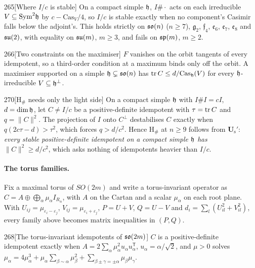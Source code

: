 \begin{Lem}{265}[Where $I/c$ is stable]
On a compact simple $\mathfrak{h}$, $I\#\cdot$ acts on each irreducible $V\subseteq\mathrm{Sym}^2\mathfrak{h}$ by $c-\mathrm{Cas}_V/4$, so $I/c$ is stable exactly when no component's Casimir falls below the adjoint's. This holds strictly on $\mathfrak{so}(n)$ ($n\ge7$), $\mathfrak g_2$, $\mathfrak f_4$, $\mathfrak e_6$, $\mathfrak e_7$, $\mathfrak e_8$ and $\mathfrak{su}(2)$, with equality on $\mathfrak{su}(m)$, $m\ge3$, and fails on $\mathfrak{sp}(m)$, $m\ge2$.
\end{Lem}

\begin{Lem}{266}[Two constraints on the maximiser]
$F$ vanishes on the orbit tangents of every idempotent, so a third-order condition at a maximum binds only off the orbit. A maximiser supported on a simple $\mathfrak{h}\subsetneq\mathfrak{so}(n)$ has $\operatorname{tr} C\le d/\mathrm{Cas}_{\mathfrak{h}}(V)$ for every $\mathfrak{h}$-irreducible $V\subseteq\mathfrak{h}^\perp$.
\end{Lem}

\begin{Lem}{270}[H$_\#$ needs only the light side]
On a compact simple $\mathfrak{h}$ with $I\#I=cI$, $d=\dim\mathfrak{h}$, let $C\ne I/c$ be a positive-definite idempotent with $\tau=\operatorname{tr} C$ and $q=\lVert C\rVert^2$. The projection of $I$ onto $C^\perp$ destabilises $C$ exactly when $q(2c\tau-d)>\tau^2$, which forces $q>d/c^2$. Hence H$_\#$ at $n\ge9$ follows from \textbf{U$_{\mathrm s}'$}: \emph{every stable positive-definite idempotent on a compact simple $\mathfrak{h}$ has $\lVert C\rVert^2\ge d/c^2$}, which asks nothing of idempotents heavier than $I/c$.
\end{Lem}

\paragraph{The torus families.} Fix a maximal torus of $SO(2m)$ and write a torus-invariant operator as $C=A\oplus\bigoplus_\alpha\mu_\alpha I_{R_\alpha}$, with $A$ on the Cartan and a scalar $\mu_\alpha$ on each root plane. With $U_{ij}=\mu_{\varepsilon_i-\varepsilon_j}$, $V_{ij}=\mu_{\varepsilon_i+\varepsilon_j}$, $P=U+V$, $Q=U-V$ and $d_i=\sum_l(U_{il}^2+V_{il}^2)$, every family above becomes matrix inequalities in $(P,Q)$.

\begin{Lem}{268}[The torus-invariant idempotents of $\mathfrak{so}(2m)$]
$C$ is a positive-definite idempotent exactly when $A=2\sum_\alpha\mu_\alpha^2u_\alpha u_\alpha^{\mathsf T}$, $u_\alpha=\alpha/\sqrt2$, and $\mu>0$ solves $\mu_\alpha=4\mu_\alpha^3+\mu_\alpha\sum_{\beta\sim\alpha}\mu_\beta^2+\sum_{\beta\pm\gamma=\pm\alpha}\mu_\beta\mu_\gamma$.
\end{Lem}

